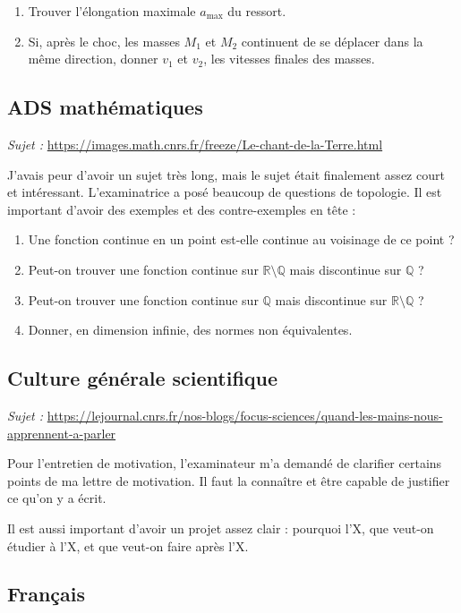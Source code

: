 \documentclass[11pt,a4paper]{article}
\begin{document}
\begin{enumerate}
    \item Trouver l'élongation maximale $a_{\max}$ du ressort.
    \item Si, après le choc, les masses $M_1$ et $M_2$ continuent de se déplacer dans la même direction, donner $v_1$ et $v_2$, les vitesses finales des masses.
\end{enumerate}

\subsection{ADS mathématiques}

\textit{Sujet :} \url{https://images.math.cnrs.fr/freeze/Le-chant-de-la-Terre.html}

J'avais peur d'avoir un sujet très long, mais le sujet était finalement assez court et intéressant.
L'examinatrice a posé beaucoup de questions de topologie. Il est important d'avoir des exemples et des contre-exemples en tête :

\begin{enumerate}
    \item Une fonction continue en un point est-elle continue au voisinage de ce point ?
    \item Peut-on trouver une fonction continue sur $\mathbb{R}\setminus \mathbb{Q}$ mais discontinue sur $\mathbb{Q}$ ?
    \item Peut-on trouver une fonction continue sur $\mathbb{Q}$ mais discontinue sur $\mathbb{R}\setminus \mathbb{Q}$ ?
    \item Donner, en dimension infinie, des normes non équivalentes.
\end{enumerate}

\subsection{Culture générale scientifique}

\textit{Sujet :} \url{https://lejournal.cnrs.fr/nos-blogs/focus-sciences/quand-les-mains-nous-apprennent-a-parler}

Pour l'entretien de motivation, l'examinateur m'a demandé de clarifier certains points de ma lettre de motivation. Il faut la connaître et être capable de justifier ce qu'on y a écrit.

Il est aussi important d'avoir un projet assez clair : pourquoi l'X, que veut-on étudier à l'X, et que veut-on faire après l'X.

\subsection{Français}
\end{document}
